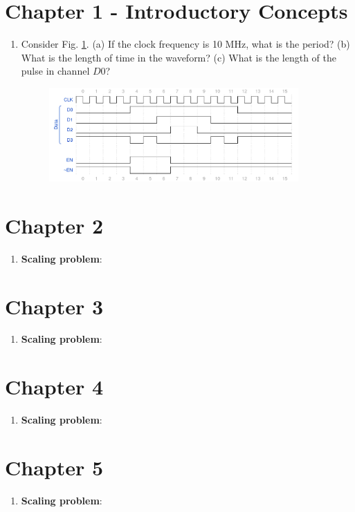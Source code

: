 \documentclass[10pt]{article}
\begin{document}
\maketitle

\section{Chapter 1 - Introductory Concepts}

\begin{enumerate}
\item Consider Fig. \ref{fig:timing1}. (a) If the clock frequency is 10 MHz, what is the period?  (b) What is the length of time in the waveform? (c) What is the length of the pulse in channel $D0$?
\begin{figure}[ht]
\centering
\includegraphics[width=0.9\textwidth]{timingExample1.pdf}
\caption{\label{fig:timing1}}
\end{figure}
\end{enumerate}

\section{Chapter 2}

\begin{enumerate}
\item \textbf{Scaling problem}: 
\end{enumerate}

\section{Chapter 3}

\begin{enumerate}
\item \textbf{Scaling problem}: 
\end{enumerate}

\section{Chapter 4}

\begin{enumerate}
\item \textbf{Scaling problem}: 
\end{enumerate}

\section{Chapter 5}

\begin{enumerate}
\item \textbf{Scaling problem}: 
\end{enumerate}
\end{document}
